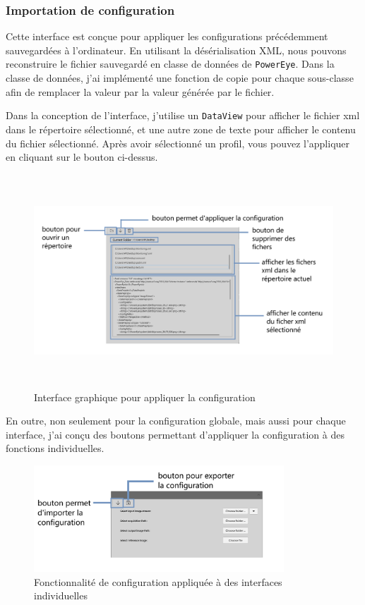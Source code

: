 \subsubsection{Importation de configuration}
Cette interface est conçue pour appliquer les configurations précédemment sauvegardées à l'ordinateur. En utilisant la désérialisation XML, nous pouvons reconstruire le fichier sauvegardé en classe de données de \texttt{PowerEye}. Dans la classe de données, j'ai implémenté une fonction de copie pour chaque sous-classe afin de remplacer la valeur par la valeur générée par le fichier. 

Dans la conception de l'interface, j'utilise un \texttt{DataView} pour afficher le fichier xml dans le répertoire sélectionné, et une autre zone de texte pour afficher le contenu du fichier sélectionné. Après avoir sélectionné un profil, vous pouvez l'appliquer en cliquant sur le bouton ci-dessus.
\begin{figure}[H]
    \centering
    \includegraphics[height=8cm]{ressources/images/configuration_files.png}
    \caption{Interface graphique pour appliquer la configuration}
\end{figure}

En outre, non seulement pour la configuration globale, mais aussi pour chaque interface, j'ai conçu des boutons permettant d'appliquer la configuration à des fonctions individuelles. 
\begin{figure}[H]
    \centering
    \includegraphics[height=4cm]{ressources/images/configuration_individuel.png}
    \caption{Fonctionnalité de configuration appliquée à des interfaces individuelles}
\end{figure}

